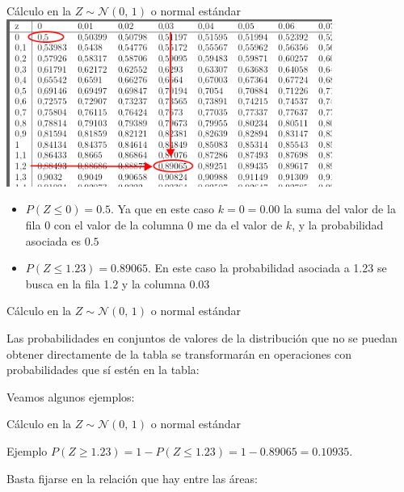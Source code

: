 \documentclass[11pt]{beamer}
\begin{document}
\begin{frame}{Cálculo en la $Z \sim \mathcal{N}(0,\,1)$ o normal estándar}
\includegraphics[page=1,width=0.8\textwidth]{probabilidad/calculonormal.png}
\begin{itemize} [<+->]
    \item $P\left(Z\leq 0 \right)=0.5 $. Ya que en este caso $k=0=0.00$ la suma del valor de la fila 0 con el valor de la columna 0 me da el valor de $k$, y la probabilidad asociada es $0.5$
    \item $P\left(Z\leq 1.23 \right)= 0.89065$. En este caso la probabilidad asociada a 1.23 se busca en la fila 1.2 y la columna 0.03 
\end{itemize}



\end{frame}

\begin{frame}{Cálculo en la $Z \sim \mathcal{N}(0,\,1)$ o normal estándar} 
\begin{block}{}
    Las probabilidades en conjuntos de valores de la distribución que no se puedan obtener directamente de la tabla se transformarán en operaciones con probabilidades que sí estén en la tabla:
\end{block}
Veamos algunos ejemplos:
\end{frame}


\begin{frame}{Cálculo en la $Z \sim \mathcal{N}(0,\,1)$ o normal estándar}
\begin{block}{Ejemplo}
$P\left(Z\geq 1.23 \right)= 1 - P\left(Z\leq 1.23 \right) = 1 - 0.89065= 0.10935$.
\end{block}
Basta fijarse en la relación que hay entre las áreas:
\begin{center}
    
\end{center}

\begin{columns}
\begin{column}{0.5\textwidth}
 
\end{column}
\begin{column}{0.5\textwidth}
 
\end{column}
\end{columns}
\end{frame}
\end{document}
